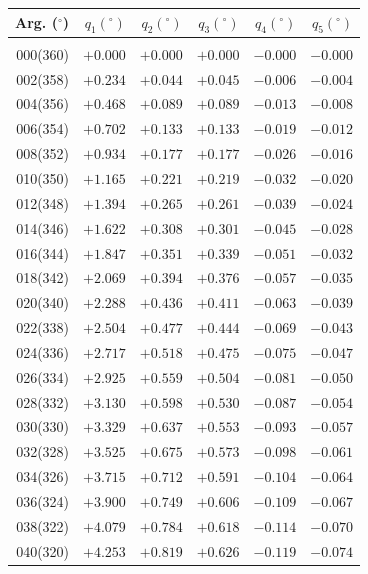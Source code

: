 \clearpage
\begin{table}[!h]
\vspace{0.25cm}
\centering
\begin{tabular}{rrrrrr}
Arg. ($^\circ$) & $q_1(^\circ)$  & $q_2(^\circ)$ & $q_3(^\circ)$ & $q_4(^\circ)$  & $q_5(^\circ)$\\\hline
&&&&&\\[-1.75ex]
000(360) & $+0.000$ & $+0.000$ & $+0.000$ & $-0.000$ & $-0.000$ \\
002(358) & $+0.234$ & $+0.044$ & $+0.045$ & $-0.006$ & $-0.004$ \\
004(356) & $+0.468$ & $+0.089$ & $+0.089$ & $-0.013$ & $-0.008$ \\
006(354) & $+0.702$ & $+0.133$ & $+0.133$ & $-0.019$ & $-0.012$ \\ 
008(352) & $+0.934$ & $+0.177$ & $+0.177$ & $-0.026$ & $-0.016$ \\
010(350) & $+1.165$ & $+0.221$ & $+0.219$ & $-0.032$ & $-0.020$ \\ 
012(348) & $+1.394$ & $+0.265$ & $+0.261$ & $-0.039$ & $-0.024$ \\ 
014(346) & $+1.622$ & $+0.308$ & $+0.301$ & $-0.045$ & $-0.028$ \\ 
016(344) & $+1.847$ & $+0.351$ & $+0.339$ & $-0.051$ & $-0.032$ \\ 
018(342) & $+2.069$ & $+0.394$ & $+0.376$ & $-0.057$ & $-0.035$ \\ 
020(340) & $+2.288$ & $+0.436$ & $+0.411$ & $-0.063$ & $-0.039$ \\ 
022(338) & $+2.504$ & $+0.477$ & $+0.444$ & $-0.069$ & $-0.043$ \\ 
024(336) & $+2.717$ & $+0.518$ & $+0.475$ & $-0.075$ & $-0.047$ \\ 
026(334) & $+2.925$ & $+0.559$ & $+0.504$ & $-0.081$ & $-0.050$ \\ 
028(332) & $+3.130$ & $+0.598$ & $+0.530$ & $-0.087$ & $-0.054$ \\
030(330) & $+3.329$ & $+0.637$ & $+0.553$ & $-0.093$ & $-0.057$ \\ 
032(328) & $+3.525$ & $+0.675$ & $+0.573$ & $-0.098$ & $-0.061$ \\ 
034(326) & $+3.715$ & $+0.712$ & $+0.591$ & $-0.104$ & $-0.064$ \\ 
036(324) & $+3.900$ & $+0.749$ & $+0.606$ & $-0.109$ & $-0.067$ \\ 
038(322) & $+4.079$ & $+0.784$ & $+0.618$ & $-0.114$ & $-0.070$ \\ 
040(320) & $+4.253$ & $+0.819$ & $+0.626$ & $-0.119$ & $-0.074$ \\ 

\end{tabular}
\end{table}

